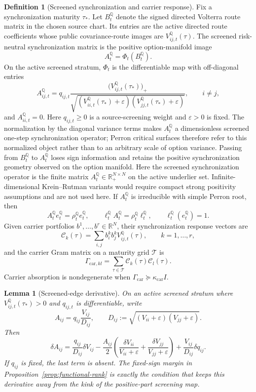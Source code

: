 \documentclass[11pt,a4paper]{amsart}
\theoremstyle{plain}
\newtheorem{lemma}[theorem]{Lemma}
\theoremstyle{definition}
\newtheorem{definition}[theorem]{Definition}
\theoremstyle{remark}
\newcommand{\R}{\mathbb{R}}
\newcommand{\QQ}{\mathbb{Q}}
\newcommand{\eps}{\varepsilon}
\begin{document}
\begin{definition}[Screened synchronization and carrier response]\label{def:screened-sync-functional}
Fix a synchronization maturity \(\tau_*\).  Let \(B_t^\QQ\) denote the signed directed Volterra
route matrix in the chosen source chart.  Its entries are the active directed route coefficients
whose public covariance-route images are \(V_{ij,t}^\QQ(\tau)\).  The screened risk-neutral
synchronization matrix is the positive option-manifold image
\[
        A_t^\QQ=\Phi_t(B_t^\QQ).
\]
On the active screened stratum, \(\Phi_t\) is the differentiable map with off-diagonal entries
\[
        A_{ij,t}^\QQ
        =
        q_{ij,t}
        \frac{\bigl(V_{ij,t}^\QQ(\tau_*)\bigr)_+}
        {\sqrt{(V_{ii,t}^\QQ(\tau_*)+\varepsilon)
        (V_{jj,t}^\QQ(\tau_*)+\varepsilon)}},
        \qquad i\ne j,
\]
and \(A_{ii,t}^\QQ=0\).  Here \(q_{ij,t}\ge0\) is a source-screening weight and
\(\varepsilon>0\) is fixed.  The normalization by the diagonal variance terms makes
\(A_t^\QQ\) a dimensionless screened one-step synchronization operator; Perron critical surfaces
therefore refer to this normalized object rather than to an arbitrary scale of option variance.
Passing from \(B_t^\QQ\) to \(A_t^\QQ\) loses sign information and retains the positive
synchronization geometry observed on the option manifold.  Here the screened synchronization
operator is the finite
matrix \(A_t^\QQ\in\R_+^{N\times N}\) on the active underlier set.  Infinite-dimensional
Krein--Rutman variants would require compact strong positivity assumptions and are not used here.
If \(A_t^\QQ\) is irreducible with simple Perron root, then
\[
        A_t^\QQ e_t^\QQ=\rho_t^\QQ e_t^\QQ,\qquad
        \ell_t^\QQ A_t^\QQ=\rho_t^\QQ\ell_t^\QQ,\qquad
        \ell_t^\QQ(e_t^\QQ)=1.
\]
Given carrier portfolios \(b^1,\dots,b^r\in\R^N\), their synchronization response vectors are
\[
        \mathcal C_k(\tau)
        =
        \sum_{i,j}b_i^k b_j^k V_{ij,t}^\QQ(\tau),
        \qquad k=1,\dots,r,
\]
and the carrier Gram matrix on a maturity grid \(\mathcal T\) is
\[
        \Gamma_{\mathrm{car},kl}
        =
        \sum_{\tau\in\mathcal T}
        \mathcal C_k(\tau)\mathcal C_l(\tau).
\]
Carrier absorption is nondegenerate when
\(\Gamma_{\mathrm{car}}\succeq\kappa_{\mathrm{car}}I\).
\end{definition}

\begin{lemma}[Screened-edge derivative]\label{lem:screened-edge-derivative}
On an active screened stratum where \(V_{ij,t}^\QQ(\tau_*)>0\) and \(q_{ij,t}\) is differentiable,
write
\[
        A_{ij}
        =
        q_{ij}\frac{V_{ij}}{D_{ij}},
        \qquad
        D_{ij}:=\sqrt{(V_{ii}+\eps)(V_{jj}+\eps)} .
\]
Then
\[
        \delta A_{ij}
        =
        \frac{q_{ij}}{D_{ij}}\delta V_{ij}
        -
        \frac{A_{ij}}2
        \left(
        \frac{\delta V_{ii}}{V_{ii}+\eps}
        +
        \frac{\delta V_{jj}}{V_{jj}+\eps}
        \right)
        +
        \frac{V_{ij}}{D_{ij}}\delta q_{ij}.
\]
If \(q_{ij}\) is fixed, the last term is absent.  The fixed-sign margin in
Proposition~\ref{prop:functional-rank} is exactly the condition that keeps this derivative away
from the kink of the positive-part screening map.
\end{lemma}
\end{document}
